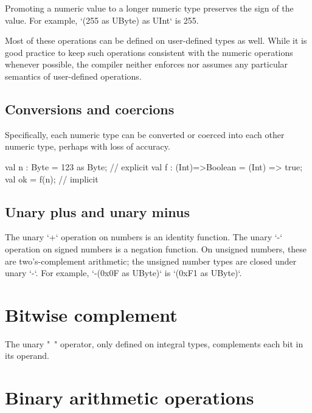 Promoting a numeric value to a longer numeric type preserves the sign of the
value.  For example, \xcd`(255 as UByte) as UInt` is 255. 

Most of these operations can be defined on user-defined types as well.  While
it is good practice to keep such operations consistent with the numeric
operations whenever possible, the compiler neither enforces nor assumes any
particular semantics of user-defined operations. 

\subsection{Conversions and coercions}
\label{sect:ConvAndCoerc}

Specifically, each numeric type can be converted or coerced into each other
numeric type, perhaps with loss of accuracy.

\begin{ex}
\begin{xten}
val n : Byte = 123 as Byte; // explicit 
val f : (Int)=>Boolean = (Int) => true; 
val ok = f(n); // implicit
\end{xten}
\end{ex}


\subsection{Unary plus and unary minus}

The unary \xcd`+` operation on numbers is an identity function.
The unary \xcd`-` operation on signed numbers is a negation function.
On unsigned numbers, these are two's-complement arithmetic; the unsigned
number types are closed under unary \xcd`-`.  For example, 
\xcd`-(0x0F as UByte)` is 
\xcd`(0xF1 as UByte)`.  




\section{Bitwise complement}

The unary \xcd"~" operator, only defined on integral types, complements each
bit in its operand.  

\section{Binary arithmetic operations} 

